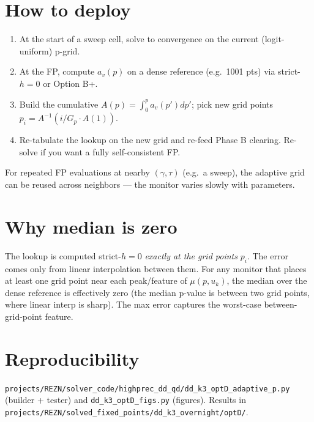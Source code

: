\documentclass[11pt]{article}
\begin{document}
\section{How to deploy}

\begin{enumerate}
  \item At the start of a sweep cell, solve to convergence on the current
        (logit-uniform) p-grid.
  \item At the FP, compute $a_v(p)$ on a dense reference (e.g.\ 1001 pts)
        via strict-$h{=}0$ or Option B+.
  \item Build the cumulative $A(p) = \int_0^p a_v(p') dp'$; pick new
        grid points $p_i = A^{-1}(i/G_p \cdot A(1))$.
  \item Re-tabulate the lookup on the new grid and re-feed Phase B
        clearing. Re-solve if you want a fully self-consistent FP.
\end{enumerate}

For repeated FP evaluations at nearby $(\gamma, \tau)$ (e.g.\ a sweep),
the adaptive grid can be reused across neighbors --- the monitor varies
slowly with parameters.

\section{Why median is zero}

The lookup is computed strict-$h{=}0$ \emph{exactly at the grid points}
$p_i$. The error comes only from linear interpolation between them. For
any monitor that places at least one grid point near each peak/feature of
$\mu(p, u_k)$, the median over the dense reference is effectively zero
(the median p-value is between two grid points, where linear interp is
sharp). The max error captures the worst-case between-grid-point feature.

\section{Reproducibility}
\texttt{projects/REZN/solver\_code/highprec\_dd\_qd/dd\_k3\_optD\_adaptive\_p.py}
(builder + tester) and \texttt{dd\_k3\_optD\_figs.py} (figures).
Results in
\texttt{projects/REZN/solved\_fixed\_points/dd\_k3\_overnight/optD/}.
\end{document}

